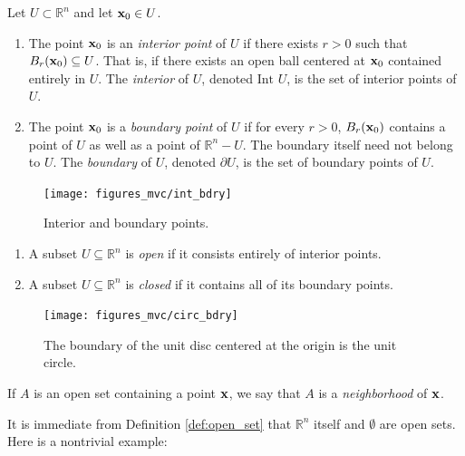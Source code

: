 \documentclass[12pt,letterpaper,reqno]{article}
\numberwithin{equation}{section}
\newcommand{\R}{\ensuremath{\mathbb R}}
\newcommand{\bx}{{\bf x}}
\begin{document}
{\begin{defn}
	Let $U \subset \R^n$ and let $\bx_0 \in U$.
	\begin{enumerate}[(1)]
		\item The point $\bx_0$ is an \emph{interior point} of $U$ if there exists $r>0$ such that $B_r(\bx_0) \subseteq U$. That is, if there exists an open ball centered at $\bx_0$ contained entirely in $U$. The \emph{interior} of $U$, denoted $\text{Int }U$, is the set of interior points of $U$.
		\item The point $\bx_0$ is a \emph{boundary point} of $U$ if for every $r>0$, $B_r(\bx_0)$ contains a point of $U$ as well as a point of $\R^n-U$. The boundary itself need not belong to $U$. The \emph{boundary} of $U$, denoted $\partial U$, is the set of boundary points of $U$.
	\end{enumerate}
\end{defn}

\begin{figure}[h]
	\begin{center}
		\texttt{[image: figures\_mvc/int\_bdry]}
	\end{center}
	\caption{Interior and boundary points.}
\end{figure}


\begin{defn}\hspace{15cm}
	\begin{enumerate}[(1)]
		\item A subset $U \subseteq \R^n$ is \emph{open} if it consists entirely of interior points.
		\item A subset $U \subseteq \R^n$ is \emph{closed} if it contains all of its boundary points.
	\end{enumerate}
\end{defn}

\begin{figure}[h]
	\begin{center}
		\texttt{[image: figures\_mvc/circ\_bdry]}
	\end{center}
	\caption{The boundary of the unit disc centered at the origin is the unit circle.}
\end{figure}

\begin{defn}[Neighborhood]
If $A$ is an open set containing a point $\bx$, we say that $A$ is a \emph{neighborhood} of $\bx$.	
\end{defn}


It is immediate from Definition \ref{def:open_set} that $\R^n$ itself and $\emptyset$ are open sets. Here is a nontrivial example:

}
\end{document}

